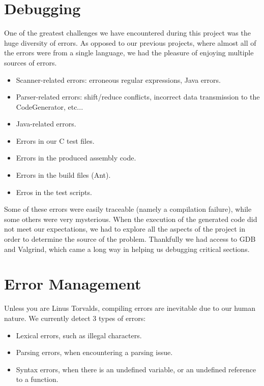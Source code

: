 \documentclass{scrartcl}
\begin{document}
\section{Debugging}
One of the greatest challenges we have encountered during this project was the huge diversity of errors. As opposed to our previous projects, where almost all of the errors were from a single language, we had the pleasure of enjoying multiple sources of errors.\\

\begin{itemize}
\item Scanner-related errors: erroneous regular expressions, Java errors.
\item Parser-related errors: shift/reduce conflicts, incorrect data transmission to the CodeGenerator, etc...
\item Java-related errors.
\item Errors in our C test files.
\item Errors in the produced assembly code.
\item Errors in the build files (Ant).
\item Erros in the test scripts.
\end{itemize}

Some of these errors were easily traceable (namely a compilation failure), while some others were very mysterious. When the execution of the generated code did not meet our expectations, we had to explore all the aspects of the project in order to determine the source of the problem. Thankfully we had access to GDB and Valgrind, which came a long way in helping us debugging critical sections.\\


\section{Error Management}
Unless you are Linus Torvalds, compiling errors are inevitable due to our human nature. We currently detect 3 types of errors:

\begin{itemize}
\item Lexical errors, such as illegal characters.
\item Parsing errors, when encountering a parsing issue.
\item Syntax errors, when there is an undefined variable, or an undefined reference to a function.
\end{itemize}
\end{document}
